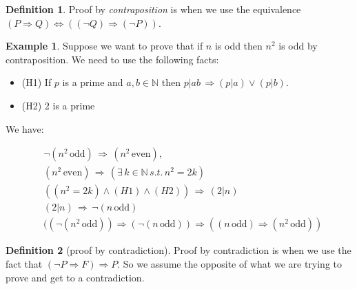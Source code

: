 \documentclass[
]{book}
\theoremstyle{definition}
\newtheorem{definition}{Definition}[chapter]
\theoremstyle{definition}
\newtheorem{example}{Example}[chapter]
\theoremstyle{definition}
\theoremstyle{definition}
\theoremstyle{remark}
\begin{document}
\begin{definition}
Proof by \emph{contraposition} is when we use the equivalence \((P\Rightarrow Q) \Leftrightarrow ((\neg Q) \Rightarrow (\neg P))\).
\end{definition}

\begin{example}
Suppose we want to prove that if \(n\) is odd then \(n^2\) is odd by contraposition. We need to use the following facts:

\begin{itemize}
\item
  (H1) If \(p\) is a prime and \(a,b \in \mathbb{N}\) then \(p|ab \, \Rightarrow (p|a)\vee(p|b)\).
\item
  (H2) 2 is a prime
\end{itemize}

We have:

\begin{align*}
& \neg (n^2 \, \mbox{odd}) \, \Rightarrow \, (n^2 \, \mbox{even}), \\
& (n^2 \, \mbox{even}) \, \Rightarrow \, (\exists \, k \in \mathbb{N} \, s.t. \, n^2=2k) \\
& ((n^2=2k)\wedge(H1)\wedge(H2))\, \Rightarrow \,(2|n)\\
& (2|n)\, \Rightarrow \, \neg(n \, \mbox{odd})\\
& ((\neg(n^2 \, \mbox{odd})) \Rightarrow (\neg(n \, \mbox{odd})) \Rightarrow ((n \, \mbox{odd})\Rightarrow (n^2 \, \mbox{odd}))
\end{align*}
\end{example}

\begin{definition}[proof by contradiction]
Proof by contradiction is when we use the fact that \((\neg P \Rightarrow F) \Rightarrow P\). So we assume the opposite of what we are trying to prove and get to a contradiction.
\end{definition}
\end{document}
